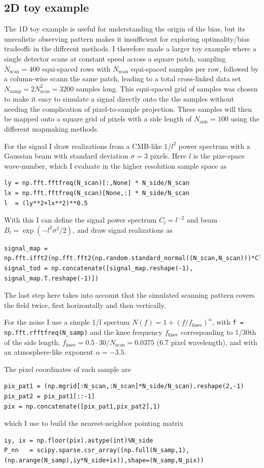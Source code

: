 \documentclass[twocolumn,apj]{aastex63}
\begin{document}
\subsection{2D toy example}
\label{sec:toy-2d}
The 1D toy example is useful for understanding the origin of the bias, but
its unrealistic observing pattern makes it insufficient for exploring
optimality/bias tradeoffs in the different methods. I therefore made a larger
toy example where a single detector scans at constant speed across a square
patch, sampling $N_\text{scan} = 400$ equi-spaced rows with $N_\text{scan}$
equi-spaced samples per row, followed by a column-wise scann the same patch,
leading to a total cross-linked data set $N_\text{samp} = 2 N_\text{scan}^2 = 3200$
samples long. This equi-spaced grid of samples was chosen to make it easy to
simulate a signal directly onto the the samples without needing the complication
of pixel-to-sample projection. These samples will then be mapped onto a
square grid of pixels with a side length of $N_\text{side} = 100$ using
the different mapmaking methods.

For the signal I draw realizations from a CMB-like $1/l^2$ power spectrum
with a Gaussian beam with standard deviation $\sigma=3$ pixels. Here $l$
is the pixe-space wave-number, which I evaluate in the higher
resolution sample space as
\begin{lstlisting}
ly = np.fft.fftfreq(N_scan)[:,None] * N_side/N_scan
lx = np.fft.fftfreq(N_scan)[None,:] * N_side/N_scan
l  = (ly**2+lx**2)**0.5
\end{lstlisting}
With this I can define the signal power spectrum $C_l = l^{-2}$ and beam $B_l = \exp(-l^2 \sigma^2/2)$,
and draw signal realizations as
\begin{lstlisting}
signal_map = np.fft.ifft2(np.fft.fft2(np.random.standard_normal((N_scan,N_scan)))*Cl**0.5*Bl).real
signal_tod = np.concatenate([signal_map.reshape(-1), signal_map.T.reshape(-1)])
\end{lstlisting}
The last step here takes into account that the simulated scanning pattern covers the
field twice, first horizontally and then vertically.

For the noise I use a simple 1/f spectum $N(f) = 1 + (f/f_\text{knee})^\alpha$,
with \lstinline{f = np.fft.rfftfreq(N_samp)}
and the knee frequency $f_\text{knee}$ corresponding to 1/30th of the side length,
$f_\text{knee} = 0.5\cdot 30/N_\text{scan} = 0.0375$ (6.7 pixel wavelength), and with
an atmosphere-like exponent $\alpha=-3.5$.

The pixel coordinates of each sample are
\begin{lstlisting}
pix_pat1 = (np.mgrid[:N_scan,:N_scan]*N_side/N_scan).reshape(2,-1)
pix_pat2 = pix_pat1[::-1]
pix = np.concatenate([pix_pat1,pix_pat2],1)
\end{lstlisting}
which I use to build the nearest-neighbor pointing matrix
\begin{lstlisting}
iy, ix = np.floor(pix).astype(int)%N_side
P_nn   = scipy.sparse.csr_array((np.full(N_samp,1),(np.arange(N_samp),iy*N_side+ix)),shape=(N_samp,N_pix))
\end{lstlisting}
\end{document}
